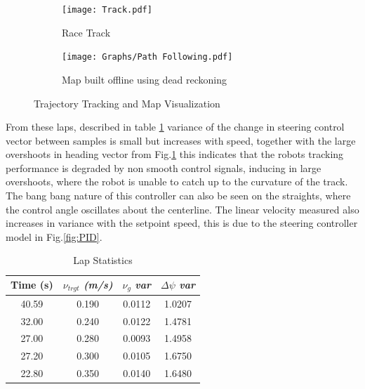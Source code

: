             \begin{figure}[H]
                \centering
                \begin{subfigure}[c]{0.35\textwidth}
                    \texttt{[image: Track.pdf]}
                    \caption{Race Track}
                \end{subfigure}
                \hfill
                \begin{subfigure}[c]{0.6\textwidth}
                    \texttt{[image: Graphs/Path Following.pdf]}
                    \caption{Map built offline using dead reckoning}
                \end{subfigure}
                \caption{Trajectory Tracking and Map Visualization}
                \label{fig:TrajTrack}
            \end{figure}
            From these laps, described in table \ref{tab:lap_stats} variance of the change in steering control vector between samples is small 
            but increases with speed, together with the large overshoots in heading vector from Fig.\ref{fig:TrajTrack} this indicates 
            that the robots tracking performance is degraded by non smooth control signals, inducing in large overshoots, where the robot is 
            unable to catch up to the curvature of the track.
            The bang bang nature of this controller can also be seen 
            on the straights, where the control angle oscillates about the centerline. 
            The linear velocity measured also increases in variance with the setpoint speed, this is due to 
            the steering controller model in Fig.\ref{fig:PID}. 
            \begin{table}[h]
                \centering
                \begin{tabular}{cccc}
                    \toprule
                    \textbf{Time (s)} & $\nu_{trgt}$ \textit{(m/s)} & $\nu_g$ \textit{var}& $\Delta\psi$ \textit{var} \\  
                    \midrule
                    40.59 & 0.190 & 0.0112 & 1.0207 \\  
                    32.00 & 0.240 & 0.0122 & 1.4781 \\  
                    27.00 & 0.280 & 0.0093 & 1.4958 \\  
                    27.20 & 0.300 & 0.0105 & 1.6750 \\  
                    22.80 & 0.350 & 0.0140 & 1.6480 \\  
                    \bottomrule
                \end{tabular}
                \caption{Lap Statistics}
                \label{tab:lap_stats}
            \end{table}


